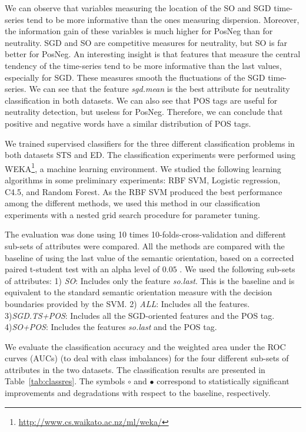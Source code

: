 \documentclass{sig-alternate}
\begin{document}
We can observe that variables measuring the location of the SO and SGD time-series tend to be more informative than the ones measuring dispersion. Moreover, the information gain of these variables is much higher for PosNeg than for neutrality. SGD and SO are competitive measures for neutrality, but SO is far better for PosNeg. An interesting insight is that features that measure the central tendency of the time-series tend to be more informative than the last values, especially for SGD. These measures smooth the fluctuations of the SGD time-series. We can see that the feature \emph{sgd.mean} is the best attribute for neutrality classification in both datasets. We can also see that POS tags are useful for neutrality detection, but useless for PosNeg. Therefore, we can conclude that positive and negative words have a similar distribution of POS tags. 

We trained supervised classifiers for the three different classification problems in both datasets STS and ED. The classification experiments were performed using WEKA\footnote{\url{http://www.cs.waikato.ac.nz/ml/weka/}}, a machine learning environment. We studied the following learning algorithms in some preliminary experiments: RBF SVM, Logistic regression, C4.5, and Random Forest. As the RBF SVM produced the best performance among the different methods, we used this method in our  classification experiments with a nested grid search procedure for parameter tuning. 

The evaluation was done using 10 times 10-folds-cross-validation and different sub-sets of attributes were compared.  All the methods are compared with the baseline of using the last value of the semantic orientation, based on a corrected paired t-student test with an alpha level of $0.05$ \cite{nadeau2003inference}.  We used the following  sub-sets of attributes: 1) \emph{SO}: Includes only the feature \emph{so.last}. This is the baseline and is equivalent to the standard semantic orientation measure with the decision boundaries provided by the SVM. 2) \emph{ALL}: Includes all the features. 3)\emph{SGD.TS+POS}: Includes all the SGD-oriented features and the POS tag. 4)\emph{SO+POS}: Includes the features \emph{so.last} and the POS tag.

We evaluate the classification accuracy and the weighted area under the ROC curves (AUCs) (to deal with class imbalances) for the four different sub-sets of attributes in the two datasets.  The classification results are presented in Table~\ref{tab:classres}. The symbols $\circ$ and $\bullet$ correspond to statistically significant improvements and degradations with respect to the baseline, respectively.
\end{document}
